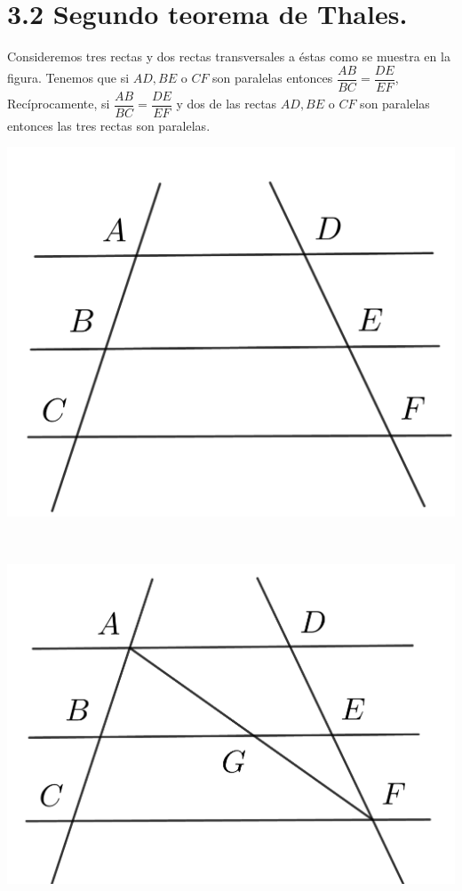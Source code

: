 \documentclass[12pt,a4paper, oneside]{book}
\begin{document}
\section{3.2 Segundo teorema de Thales.}
Consideremos tres rectas y dos rectas transversales a éstas como se muestra en la figura. Tenemos que si $AD, BE$ o $CF$ son paralelas entonces $\dfrac{AB}{BC}=\dfrac{DE}{EF}$, Recíprocamente, si $\dfrac{AB}{BC}=\dfrac{DE}{EF}$ y dos de las rectas $AD, BE$ o $CF$ son paralelas entonces las tres rectas son paralelas.
\begin{center}
\includegraphics[scale=0.6]{Imagenes/thales.png} 
\end{center}
\\
\begin{center}
\includegraphics[scale=0.6]{Imagenes/thales2.png} 
\end{center}
\end{document}
